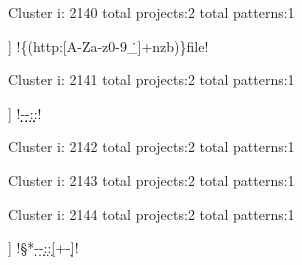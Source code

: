 Cluster i: 2140
total projects:2
total patterns:1
\begin{multicols}{1}
\begin{description}[noitemsep,topsep=0pt]
\item [[2] ] \cverb!\{(http:\/\/[A-Za-z0-9_\.\/]+\/nzb)\}file!
\end{description}
\end{multicols}







Cluster i: 2141
total projects:2
total patterns:1
\begin{multicols}{1}
\begin{description}[noitemsep,topsep=0pt]
\item [[2] ] \cverb!\d\d\d\d-\d\d-\d\dT\d\d:\d\d:\d\dZ!
\end{description}
\end{multicols}







Cluster i: 2142
total projects:2
total patterns:1
\begin{multicols}{1}
\end{multicols}







Cluster i: 2143
total projects:2
total patterns:1
\begin{multicols}{1}
\end{multicols}







Cluster i: 2144
total projects:2
total patterns:1
\begin{multicols}{1}
\begin{description}[noitemsep,topsep=0pt]
\item [[2] ] \cverb!\S* *\d*-\d*-\d* \d*:\d*:\d* [+-]\d* \w*!
\end{description}
\end{multicols}







